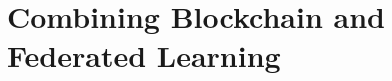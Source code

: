 \chapter{Combining Blockchain and Federated Learning}\label{chap:integration}



\clearpage{\pagestyle{empty}}



\clearpage{\pagestyle{empty}}



